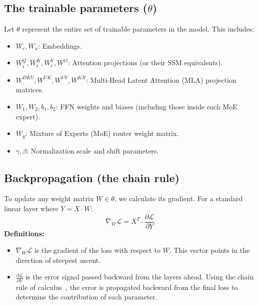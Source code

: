 \documentclass[11pt]{article}
\begin{document}
	\subsection{The trainable parameters ($\theta$)}
	Let $\theta$ represent the entire set of trainable parameters in the model.
	This includes:
	\begin{itemize}
		\item $W_e, W_u$: Embeddings.
		\item $W_i^Q, W_i^K, W_i^V, W^O$: Attention projections (or their SSM equivalents).
		\item $W^{DKV}, W^{UK}, W^{UV}, W^{KR}$: Multi-Head Latent Attention (MLA) projection matrices.
		\item $W_1, W_2, b_1, b_2$: FFN weights and biases (including those inside each MoE expert).
		\item $W_g$: Mixture of Experts (MoE) router weight matrix.
		\item $\gamma, \beta$: Normalization scale and shift parameters.
	\end{itemize}
	
	\subsection{Backpropagation (the chain rule)}
	To update any weight matrix $W \in \theta$, we calculate its gradient.
	For a standard linear layer where $Y = X \cdot W$:
	\begin{equation}
		\nabla_W \mathcal{L} = X^T \cdot \frac{\partial \mathcal{L}}{\partial Y}
	\end{equation}
	\textbf{Definitions:} 
	\begin{itemize}
		\item $\nabla_W \mathcal{L}$ is the gradient of the loss with respect to $W$.
		This vector points in the direction of steepest ascent.
		\item $\frac{\partial \mathcal{L}}{\partial Y}$ is the error signal passed backward from the layers ahead.
		Using the chain rule of calculus~\cite{rumelhart1986learning}, the error is propagated backward from the final loss to determine the contribution of each parameter.
	\end{itemize}
	
\end{document}
